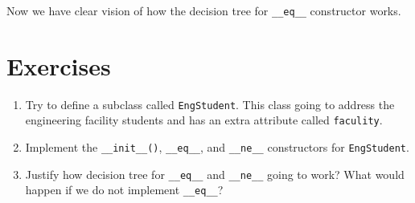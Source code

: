 \documentclass[11pt]{article}
\begin{document}
Now we have clear vision of how the decision tree for \texttt{\_\_eq\_\_} constructor
works.


\section{Exercises}
\label{sec:org033956f}

\begin{enumerate}
\item Try to define a subclass called \texttt{EngStudent}. This class going to address the
engineering facility students and has an extra attribute called \texttt{faculity}.

\item Implement the \texttt{\_\_init\_\_()}, \texttt{\_\_eq\_\_}, and \texttt{\_\_ne\_\_} constructors for
\texttt{EngStudent}.

\item Justify how decision tree for \texttt{\_\_eq\_\_} and \texttt{\_\_ne\_\_} going to work? What would
happen if we do not implement \texttt{\_\_eq\_\_}?
\end{enumerate}
\end{document}
